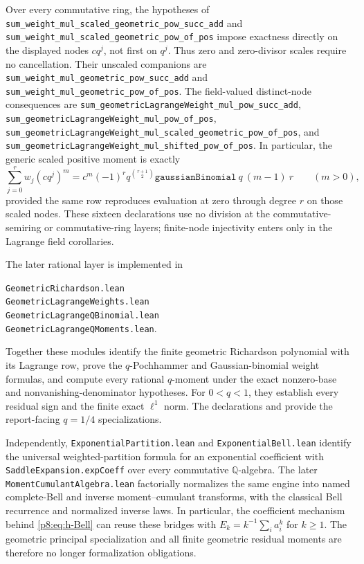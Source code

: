 \documentclass[11pt]{article}
\numberwithin{equation}{section}
\theoremstyle{definition}
\theoremstyle{remark}
\begin{document}
Over every commutative ring, the hypotheses of
\nolinkurl{sum_weight_mul_scaled_geometric_pow_succ_add} and
\nolinkurl{sum_weight_mul_scaled_geometric_pow_of_pos} impose exactness
directly on the displayed nodes \(c q^j\), not first on \(q^j\).  Thus zero
and zero-divisor scales require no cancellation.  Their unscaled companions
are \nolinkurl{sum_weight_mul_geometric_pow_succ_add} and
\nolinkurl{sum_weight_mul_geometric_pow_of_pos}.  The field-valued
distinct-node consequences are
\nolinkurl{sum_geometricLagrangeWeight_mul_pow_succ_add},
\nolinkurl{sum_geometricLagrangeWeight_mul_pow_of_pos},
\nolinkurl{sum_geometricLagrangeWeight_mul_scaled_geometric_pow_of_pos}, and
\nolinkurl{sum_geometricLagrangeWeight_mul_shifted_pow_of_pos}.  In particular,
the generic scaled positive moment is exactly
\[
 \sum_{j=0}^{r}w_j(cq^j)^m
 =c^m(-1)^r q^{\binom{r+1}{2}}
   \texttt{gaussianBinomial}\ q\ (m-1)\ r
 \qquad(m>0),
\]
provided the same row reproduces evaluation at zero through degree \(r\) on
those scaled nodes.  These sixteen declarations use no division at the
commutative-semiring or commutative-ring layers; finite-node injectivity enters
only in the Lagrange field corollaries.

The later rational layer is implemented in
\begin{center}
\texttt{GeometricRichardson.lean}\\
\texttt{GeometricLagrangeWeights.lean}\\
\texttt{GeometricLagrangeQBinomial.lean}\\
\texttt{GeometricLagrangeQMoments.lean}.
\end{center}
Together these modules identify the finite geometric Richardson polynomial
with its Lagrange row, prove the \(q\)-Pochhammer and Gaussian-binomial weight
formulas, and compute every rational \(q\)-moment
under the exact nonzero-base and nonvanishing-denominator hypotheses.  For
\(0<q<1\), they establish every residual sign and the finite exact
\(\ell^1\) norm.  The declarations
 and
 provide
the report-facing \(q=1/4\) specializations.

Independently,
\texttt{ExponentialPartition.lean} and
\texttt{ExponentialBell.lean} identify the universal weighted-partition
formula for an exponential coefficient with
\texttt{SaddleExpansion.expCoeff} over every commutative
\(\mathbb Q\)-algebra.  The later \texttt{MomentCumulantAlgebra.lean}
factorially normalizes the same engine into named complete-Bell and inverse
moment--cumulant transforms, with the classical Bell recurrence and
normalized inverse laws.  In particular, the coefficient mechanism behind
\eqref{p8:eq:h-Bell} can reuse these bridges with
\(E_k=k^{-1}\sum_i a_i^k\) for \(k\ge1\).  The geometric principal
specialization and all finite geometric residual moments are therefore no
longer formalization obligations.
\end{document}
